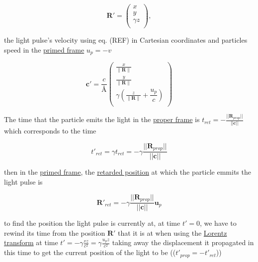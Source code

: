 \begin{equation}
	\label{displacement transform}
	\mathbf{R'} =
	\begin{pmatrix}
		x        \\
		y        \\
		\gamma z \\
	\end{pmatrix},
\end{equation}

the light pulse's velocity using eq. (REF) in Cartesian coordinates and particles speed in the \hyperlink{def-Primed-Frame}{primed frame} $u_p=-v$

\begin{equation}
	\label{light pulse velocity transform}
	\mathbf{c'} =  \dfrac{c}{\text{\AA}}
	\begin{pmatrix}
		\frac{x}{\|\mathbf{R}\|}                                        \\
		\frac{y}{\|\mathbf{R}\|}                                        \\
		\gamma \left( \frac{z}{\|\mathbf{R}\|} + \dfrac{u_p}{c} \right) \\
	\end{pmatrix}
\end{equation}

The time that the particle emits the light in the \hyperlink{def-proper-frame}{proper frame} is $t_{ret}= - \frac{||\mathbf{R}_{prop}||}{||\mathbf{c}||}$ which corresponds to the time

\begin{equation}
	t'_{ret}= \gamma t_{ret} = - \gamma \frac{||\mathbf{R}_{prop}||}{||\mathbf{c}||}
\end{equation}

then in the \hyperlink{def-Primed-Frame}{primed frame}, the \hyperlink{def-retarded-position}{retarded position}  at which the particle emmits the light pulse is

\begin{equation}
	\mathbf{R'}_{ret} = - \gamma \frac{||\mathbf{R}_{prop}||}{||\mathbf{c}||} \mathbf{u}_p
\end{equation}

to find the position the light pulse is currently at, at time $t'=0$, we have to rewind its time from the position $\mathbf{R}'$ that it is at when using the \hyperlink{def-lorentz-transform}{Lorentz transform} at time $t'= -\gamma\frac{vz}{c^2}= \gamma\frac{u_p z}{c^2}$ taking away the displacement it propagated in this time to get the current position of the light to be (($t'_{prop} = - t'_{ret}$))


